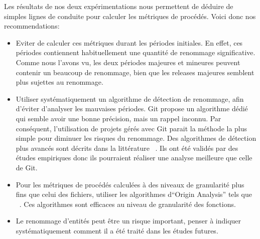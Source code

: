 Les résultats de nos deux expérimentations nous permettent de déduire de simples lignes de conduite pour calculer les métriques de procédés. Voici donc nos recommendations: 
\begin{itemize}
\item Eviter de calculer ces métriques durant les périodes initiales. En effet, ces périodes contiennent habituellement une quantité de renommage significative. Comme nous l'avons vu, les deux périodes majeures et mineures peuvent contenir un beaucoup de renommage, bien que les releases majeures semblent plus sujettes au renommage. 
\item Utiliser systématiquement un algorithme de détection de renommage, afin d'éviter d'analyser les mauvaises périodes. Git propose un algorithme dédié qui semble avoir une bonne précision, mais un rappel inconnu. Par conséquent, l'utilisation de projets gérés avec Git parait la méthode la plus simple pour diminuer les risques du renommage. Des algorithmes de détection plus avancés sont décrits dans la littérature ~\cite{antoniol_automatic_2004,lavoie_inferring_2012,steidl_incremental_2014}. Ils ont été validés par des études empiriques donc ils pourraient réaliser une analyse meilleure que celle de Git. 
\item Pour les métriques de procédés calculées à des niveaux de granularité plus fins que celui des fichiers, utiliser les algorithmes d``Origin Analysis'' tels que ~\cite{wu_aura:_2010}. Ces algorithmes sont efficaces au niveau de granularité des fonctions.
\item Le renommage d'entités peut être un risque important, penser à indiquer systématiquement comment il a été traité dans les études futures.\\       
\end{itemize}
